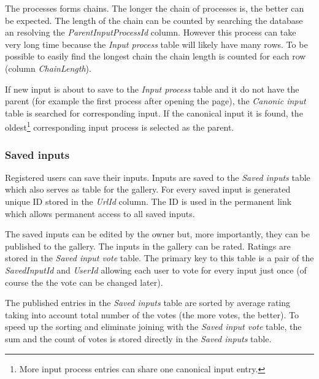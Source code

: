 The processes forms chains.
The longer the chain of processes is, the better \lsystem can be expected.
The length of the chain can be counted by searching the database an resolving the \emph{ParentInputProcessId} column.
However this process can take very long time because the \emph{Input process} table will likely have many rows.
To be possible to easily find the longest chain the chain length is counted for each row (column \emph{ChainLength}).

If new input is about to save to the \emph{Input process} table and it do not have the parent (for example the first process after opening the page), the \emph{Canonic input} table is searched for corresponding input.
If the canonical input it is found, the oldest\footnote{More input process entries can share one canonical input entry.} corresponding input process is selected as the parent.


\subsubsection{Saved inputs}

Registered users can save their inputs.
Inputs are saved to the \emph{Saved inputs} table which also serves as table for the gallery.
For every saved input is generated unique ID stored in the \emph{UrlId} column.
The ID is used in the permanent link which allows permanent access to all saved inputs.

The saved inputs can be edited by the owner but, more importantly, they can be published to the gallery.
The inputs in the gallery can be rated.
Ratings are stored in the \emph{Saved input vote} table.
The primary key to this table is a pair of the \emph{SavedInputId} and \emph{UserId} allowing each user to vote for every input just once (of course the the vote can be changed later).

The published entries in the \emph{Saved inputs} table are sorted by average rating taking into account total number of the votes (the more votes, the better).
To speed up the sorting and eliminate joining with the \emph{Saved input vote} table, the sum and the count of votes is stored directly in the \emph{Saved inputs} table.

